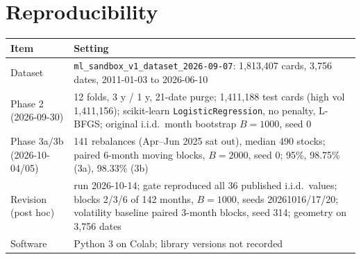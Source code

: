 \documentclass[11pt]{article}
\begin{document}
\section*{Reproducibility}
\begin{table}[h]
\centering\footnotesize
\setlength{\tabcolsep}{3pt}
\begin{tabularx}{\linewidth}{@{}lX@{}}
\toprule
Item & Setting\\
\midrule
Dataset & \texttt{ml\_sandbox\_v1\_dataset\_2026-09-07}: 1,813,407 cards, 3,756 dates, 2011-01-03 to 2026-06-10\\
Phase 2 (2026-09-30) & 12 folds, 3 y / 1 y, 21-date purge; 1,411,188 test cards (high vol 1,411,156); scikit-learn \texttt{LogisticRegression}, no penalty, L-BFGS; original i.i.d.\ month bootstrap $B=1000$, seed 0\\
Phase 3a/3b (2026-10-04/05) & 141 rebalances (Apr--Jun 2025 sat out), median 490 stocks; paired 6-month moving blocks, $B=2000$, seed 0; 95\%, 98.75\% (3a), 98.33\% (3b)\\
Revision (post hoc) & run 2026-10-14; gate reproduced all 36 published i.i.d.\ values; blocks 2/3/6 of 142 months, $B=1000$, seeds 20261016/17/20; volatility baseline paired 3-month blocks, seed 314; geometry on 3,756 dates\\
Software & Python 3 on Colab; library versions not recorded\\
\bottomrule
\end{tabularx}
\end{table}

\aistatement
{\sloppy{}\par}

\renewcommand{\bibfont}{\small}


\end{document}
